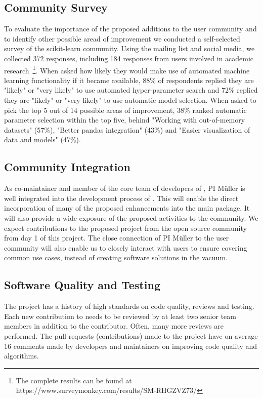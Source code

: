\subsection{Community Survey}
To evaluate the importance of the proposed additions to the \sklearn{} user community
and to identify other possible aread of improvement we conducted a self-selected
survey of the scikit-learn community. Using the \sklearn{} mailing list and social
media, we collected 372 responses, including 184 responses from users involved
in academic research~\footnote{The complete results can be found at https://www.surveymonkey.com/results/SM-RHGZVZ73/}.
When asked how likely they would make use of automated machine learning functionality
if it became available, 88\% of respondents replied they are "likely" or "very likely"
to use automated hyper-parameter search and 72\% replied they are "likely" or "very likely"
to use automatic model selection. When asked to pick the top 5 out of 14 possible areas of improvement,
38\% ranked automatic parameter selection within the top five, behind "Working with out-of-memory datasets" (57\%),
"Better pandas integration" (43\%) and "Easier visualization of data and models" (47\%).

\subsection{Community Integration}
As co-maintainer and member of the core team of developers of \sklearn{}, PI
M\"uller is well integrated into the development process of \sklearn{}.
This will enable the direct incorporation of many of the proposed enhancements
into the \sklearn{} main package.
It will also provide a wide exposure of the proposed activities to the
\sklearn{} community. We expect contributions to the proposed
project from the open source community from day 1 of this project.
The close connection of PI M\"uller to the \sklearn{} user community will
also enable us to closely interact with users to ensure covering common use cases,
instead of creating software solutions in the vacuum.

\subsection{Software Quality and Testing}
The \sklearn{} project has a history of high standards on code quality, reviews and testing.
Each new contribution to \sklearn{} needs to be reviewed by at least two senior team members
in addition to the contributor. Often, many more reviews are performed. The
pull-requests (contributions) made to the project have on average 16 comments
made by developers and maintainers on improving code quality and algorithms.

